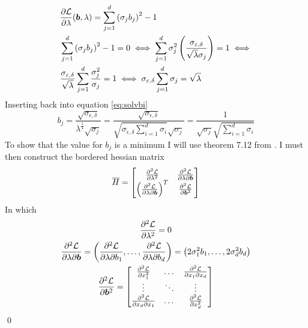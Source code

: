 \documentclass[a4paper,12pt]{article}
\renewenvironment{proof}{{\textit{Proof} \\}}{\qed}
\begin{document}
\begin{proof}
\begin{align}
\nonumber
    &\frac{\partial \mathcal{L}}{\partial \lambda}(\bm{b},\lambda) = 
    \sum_{j=1}^d \left ( \sigma_j b_j\right)^2 - 1 \\
\nonumber
    &\sum_{j=1}^d \left ( \sigma_j b_j\right)^2 - 1 = 0 \iff
    \sum_{j=1}^d \sigma_j^2 \left ( \frac{\sigma_{\varepsilon,\delta}}{\sqrt{\lambda}\sigma_j}\right) = 1 \iff \\
    \label{eq:optlam}
    &\frac{\sigma_{\varepsilon,\delta}}{\sqrt{\lambda}} \sum_{j=1}^d \frac{\sigma_j^2}{\sigma_j} = 1 \iff
    \sigma_{\varepsilon,\delta} \sum_{j=1}^d \sigma_j = \sqrt{\lambda}
\end{align}
Inserting back into equation \eqref{eq:solvbi}
\begin{equation}
\label{eq:optbj}
    b_j = \frac{\sqrt{\sigma_{\epsilon,\delta}}}{\lambda^{\frac{1}{4}} \sqrt{\sigma_j}} =
    \frac{\sqrt{\sigma_{\epsilon,\delta}}}{\sqrt{\sigma_{\epsilon,\delta} \sum_{i=1}^d \sigma_i} \sqrt{\sigma_j}} = 
    \frac{1}{\sqrt{\sigma_j} \sqrt{\sum_{i=1}^d \sigma_i} } 
\end{equation}
To show that the value for $b_j$ is a minimum I will use theorem 7.12 from \cite{matrixcalc}.
I must then construct the bordered hessian matrix
\[
    \overline{H} =
    \begin{bmatrix}
       \frac{\partial^2 \mathcal{L}}{\partial \lambda^2} & \frac{\partial^2 \mathcal{L}}{\partial \lambda \partial \bm{b}} \\
       \left (\frac{\partial^2 \mathcal{L}}{\partial \lambda \partial \bm{b}}\right)^T & \frac{\partial^2 \mathcal{L}}{\partial \bm{b}^2}
    \end{bmatrix}
\]
In which 
\begin{gather*}
\frac{\partial^2 \mathcal{L}}{\partial \lambda^2}  = 0 \\
\frac{\partial^2 \mathcal{L}}{\partial \lambda \partial \bm{b}}
    = \left (\frac{\partial^2 \mathcal{L}}{\partial \lambda \partial b_1 }, \dots,\frac{\partial^2 \mathcal{L}}{\partial \lambda \partial b_d} \right)
    = \left (2\sigma_1^2 b_1, \dots, 2\sigma_d^2 b_d\right) \\
\frac{\partial^2 \mathcal{L}}{\partial \bm{b}^2} = 
\begin{bmatrix}
    \frac{\partial^2\mathcal{L}}{\partial x_1^2} & \dots & \frac{\partial^2\mathcal{L}}{\partial x_1 \partial x_d} \\
    \vdots  & \ddots & \vdots \\
    \frac{\partial^2\mathcal{L}}{\partial x_d\partial x_1} & \dots & \frac{\partial^2\mathcal{L}}{\partial x_d^2} \\

\end{bmatrix}
\end{gather*}
\end{proof}
\end{document}

